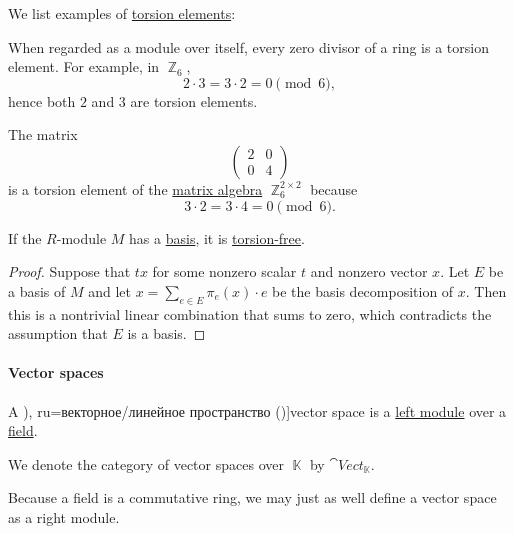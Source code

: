 \begin{example}\label{ex:def:module_torsion}
  We list examples of \hyperref[def:module_torsion]{torsion elements}:
  \begin{thmenum}
     When regarded as a module over itself, every zero divisor of a ring is a torsion element. For example, in \( \BbbZ_6 \),
    \begin{equation*}
      2 \cdot 3 = 3 \cdot 2 = 0 \pmod 6,
    \end{equation*}
    hence both \( 2 \) and \( 3 \) are torsion elements.

     The matrix
    \begin{equation*}
      \begin{pmatrix}
        2 & 0 \\
        0 & 4
      \end{pmatrix}
    \end{equation*}
    is a torsion element of the \hyperref[thm:matrix_algebra]{matrix algebra} \( \BbbZ_6^{2 \times 2} \) because
    \begin{equation*}
      3 \cdot 2 = 3 \cdot 4 = 0 \pmod 6.
    \end{equation*}
  \end{thmenum}
\end{example}

\begin{proposition}\label{thm:basis_implies_torsion_free}
  If the \( R \)-module \( M \) has a \hyperref[def:hamel_basis]{basis}, it is \hyperref[def:module_torsion]{torsion-free}.
\end{proposition}
\begin{proof}
  Suppose that \( tx \) for some nonzero scalar \( t \) and nonzero vector \( x \). Let \( E \) be a basis of \( M \) and let \( x = \sum_{e \in E} \pi_e(x) \cdot e \) be the basis decomposition of \( x \). Then this is a nontrivial linear combination that sums to zero, which contradicts the assumption that \( E \) is a basis.
\end{proof}

\paragraph{Vector spaces}

\begin{definition}\label{def:vector_space}
  A \term[ru=линейно пространство (\cite[111]{Обрешков1962ВисшаАлгебра}), ru=векторное/линейное пространство (\cite[def. 1.6.1]{Винберг2014Алгебра})]{vector space} is a \hyperref[def:module]{left module} over a \hyperref[def:field]{field}.

  We denote the category of vector spaces over \( \BbbK \) by \( \cat{Vect}_{\BbbK} \).
\end{definition}
\begin{comments}
  \item Because a field is a commutative ring, we may just as well define a vector space as a right module.
\end{comments}

